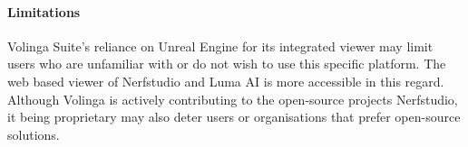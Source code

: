 \paragraph{Limitations}
Volinga Suite's reliance on Unreal Engine for its integrated viewer may limit users who are unfamiliar with or do not wish to use this specific platform.
The web based viewer of Nerfstudio and Luma AI is more accessible in this regard.
Although Volinga is actively contributing to the open-source projects Nerfstudio, it being proprietary may also deter users or organisations that prefer open-source solutions.
